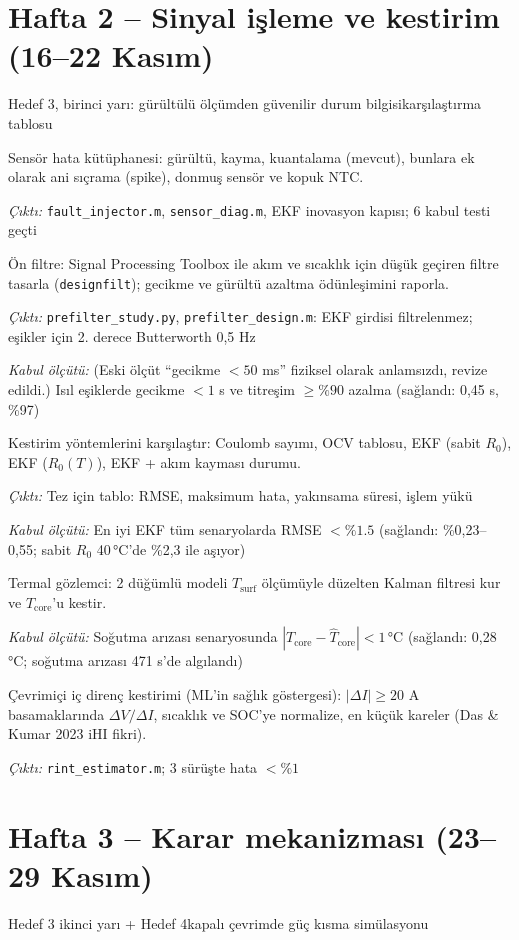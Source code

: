 \documentclass[11pt,a4paper]{article}
\newcommand{\cikti}[1]{\par{\small\textit{Çıktı:} #1}}
\newcommand{\kabul}[1]{\par{\small\textit{Kabul ölçütü:} #1}}
\begin{document}
\section{Hafta 2 -- Sinyal işleme ve kestirim (16--22 Kasım)}
\begin{faz}{Hedef 3, birinci yarı: gürültülü ölçümden güvenilir durum bilgisi}{karşılaştırma tablosu}
\end{faz}
\begin{gorev}
  \item[$\boxtimes$] Sensör hata kütüphanesi: gürültü, kayma, kuantalama (mevcut), bunlara ek olarak ani sıçrama (spike), donmuş sensör ve kopuk NTC.
  \cikti{\texttt{fault\_injector.m}, \texttt{sensor\_diag.m}, EKF inovasyon kapısı; 6 kabul testi geçti}
  \item[$\boxtimes$] Ön filtre: Signal Processing Toolbox ile akım ve sıcaklık için düşük geçiren filtre tasarla (\texttt{designfilt}); gecikme ve gürültü azaltma ödünleşimini raporla.
  \cikti{\texttt{prefilter\_study.py}, \texttt{prefilter\_design.m}: EKF girdisi filtrelenmez; eşikler için 2. derece Butterworth 0,5 Hz}
  \kabul{(Eski ölçüt ``gecikme $<50$ ms'' fiziksel olarak anlamsızdı, revize edildi.) Isıl eşiklerde gecikme $<1$ s ve titreşim $\ge\%90$ azalma (sağlandı: 0,45 s, \%97)}
  \item[$\boxtimes$] Kestirim yöntemlerini karşılaştır: Coulomb sayımı, OCV tablosu, EKF (sabit $R_0$), EKF ($R_0(T)$), EKF + akım kayması durumu.
  \cikti{Tez için tablo: RMSE, maksimum hata, yakınsama süresi, işlem yükü}
  \kabul{En iyi EKF tüm senaryolarda RMSE $<\%1.5$ (sağlandı: \%0,23--0,55; sabit $R_0$ 40\,°C'de \%2,3 ile aşıyor)}
  \item[$\boxtimes$] Termal gözlemci: 2 düğümlü modeli $T_\text{surf}$ ölçümüyle düzelten Kalman filtresi kur ve $T_\text{core}$'u kestir.
  \kabul{Soğutma arızası senaryosunda $|T_\text{core}-\hat T_\text{core}|<1$\,°C (sağlandı: 0,28\,°C; soğutma arızası 471 s'de algılandı)}
\item[$\boxtimes$] Çevrimiçi iç direnç kestirimi (ML'in sağlık göstergesi): $|\Delta I|\ge20$ A basamaklarında $\Delta V/\Delta I$, sıcaklık ve SOC'ye normalize, en küçük kareler (Das \& Kumar 2023 iHI fikri).
  \cikti{\texttt{rint\_estimator.m}; 3 sürüşte hata $<\%1$}
\end{gorev}

\section{Hafta 3 -- Karar mekanizması (23--29 Kasım)}
\begin{faz}{Hedef 3 ikinci yarı + Hedef 4}{kapalı çevrimde güç kısma simülasyonu}
\end{faz}
\end{document}
